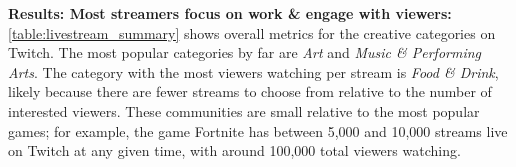 
\textbf{Results: Most streamers focus on work \& engage with viewers:}
\autoref{table:livestream_summary} shows overall metrics for the creative categories on Twitch. The most popular categories by far are \textit{Art} and \textit{Music \& Performing Arts}. The category with the most viewers watching per stream is \textit{Food \& Drink}, likely because there are fewer streams to choose from relative to the number of interested viewers. These communities are small relative to the most popular games; for example, the game Fortnite has between 5,000 and 10,000 streams live on Twitch at any given time, with around 100,000 total viewers watching. %

